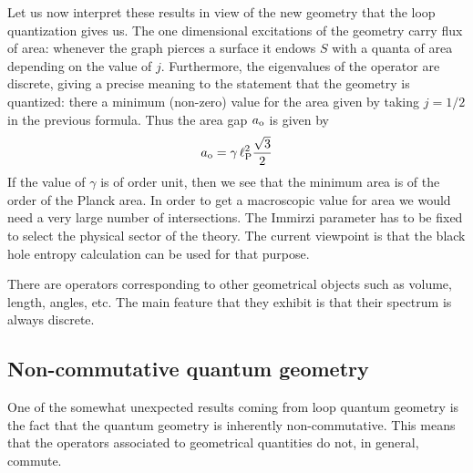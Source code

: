 \documentclass[aps,prd,tightenlines,showpacs,nofootinbib,preprint]{revtex4}
\def\be{\begin{equation}}
\def\ee{\end{equation}}
\begin{document}
Let us now interpret these results in view of the new geometry
that the loop quantization gives us. The one dimensional
excitations of the geometry carry flux of area: whenever the graph
pierces a surface  it endows $S$ with a quanta of area depending
on the value of $j$. Furthermore, the eigenvalues of the operator
are discrete, giving a precise meaning to the statement that the
geometry is quantized: there a minimum (non-zero) value for the
area given by taking $j=1/2$ in the previous formula. Thus the
area gap $a_{\rm o}$ is given by \be a_{\rm o}=\gamma\,\ell_{\rm
P}^2\frac{\sqrt{3}}{2} \ee
%
 If the value of $\gamma$  is of order
unit, then we see that the minimum area is of the order of the
Planck area. In order to get a macroscopic value for area we would
need a very large number of intersections. The Immirzi parameter
has to be fixed to select the physical sector of the theory. The
current viewpoint is that the black hole entropy calculation can
be used for that purpose.

There are operators corresponding to other geometrical objects
such as volume, length, angles, etc. The main feature that they
exhibit is that their spectrum is always discrete.


\subsection{Non-commutative quantum geometry}

One of the somewhat unexpected results coming from loop quantum
geometry is the fact that the quantum geometry is inherently
non-commutative. This means that the  operators associated to
geometrical quantities do not, in general, commute.
\end{document}
